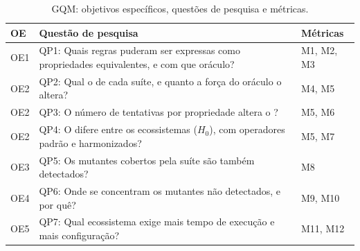 \begin{table}[!htbp]
\centering
\caption{GQM: objetivos específicos, questões de pesquisa e métricas.}
\label{tab:gqm}
\small
\begin{tabularx}{\textwidth}{@{}l Y l@{}}
\toprule
OE & Questão de pesquisa & Métricas \\
\midrule
OE1 & QP1: Quais regras puderam ser expressas como propriedades equivalentes, e com que oráculo? & M1, M2, M3 \\
OE2 & QP2: Qual o \ms{} de cada suíte, e quanto a força do oráculo o altera? & M4, M5 \\
OE2 & QP3: O número de tentativas por propriedade altera o \ms{}? & M5, M6 \\
OE2 & QP4: O \ms{} difere entre os ecossistemas ($H_0$), com operadores padrão e harmonizados? & M5, M7 \\
OE3 & QP5: Os mutantes cobertos pela suíte são também detectados? & M8 \\
OE4 & QP6: Onde se concentram os mutantes não detectados, e por quê? & M9, M10 \\
OE5 & QP7: Qual ecossistema exige mais tempo de execução e mais configuração? & M11, M12 \\
\bottomrule
\end{tabularx}
\end{table}

